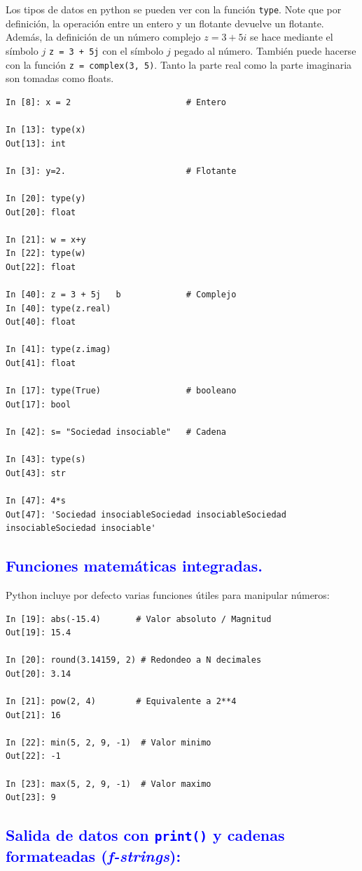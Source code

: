\documentclass[12pt]{article}
\begin{document}
Los tipos de datos en python se pueden ver con la función \lstinline|type|. Note que por definición, 
la operación entre un entero y un flotante devuelve un flotante. Además, la definición de un número 
complejo $z = 3 + 5 i $ se hace mediante el símbolo $j$ \lstinline|z = 3 + 5j| con el símbolo $j$ pegado
al número. También puede hacerse con la función  \lstinline|z = complex(3, 5)|. Tanto la parte real 
como la parte imaginaria son tomadas como floats. 
%
\begin{lstlisting}
In [8]: x = 2                       # Entero

In [13]: type(x)
Out[13]: int

In [3]: y=2.                        # Flotante

In [20]: type(y)
Out[20]: float

In [21]: w = x+y
In [22]: type(w)
Out[22]: float

In [40]: z = 3 + 5j   b             # Complejo
In [40]: type(z.real)
Out[40]: float

In [41]: type(z.imag)
Out[41]: float

In [17]: type(True)                 # booleano
Out[17]: bool

In [42]: s= "Sociedad insociable"   # Cadena

In [43]: type(s)
Out[43]: str

In [47]: 4*s
Out[47]: 'Sociedad insociableSociedad insociableSociedad insociableSociedad insociable'
\end{lstlisting}


\subsection*{\textcolor{blue}{Funciones matemáticas integradas.}}

Python incluye por defecto varias funciones útiles para manipular números:

\begin{lstlisting}
In [19]: abs(-15.4)       # Valor absoluto / Magnitud
Out[19]: 15.4

In [20]: round(3.14159, 2) # Redondeo a N decimales
Out[20]: 3.14

In [21]: pow(2, 4)        # Equivalente a 2**4
Out[21]: 16

In [22]: min(5, 2, 9, -1)  # Valor minimo
Out[22]: -1

In [23]: max(5, 2, 9, -1)  # Valor maximo
Out[23]: 9
\end{lstlisting}


\subsection*{\textcolor{blue}{Salida de datos con \texttt{print()} y cadenas 
formateadas (\textit{f-strings}):}}
\end{document}
